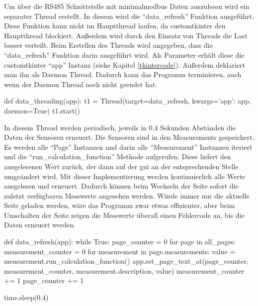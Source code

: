 \label{auslesen_rlt_parameter}

Um über die RS485 Schnittstelle mit minimalmodbus Daten auszulesen wird ein separater Thread erstellt. In diesem wird die \enquote{data\_refresh} Funktion ausgeführt. Diese Funktion kann nicht im Hauptthread laufen, da customtkinter den Hauptthread blockiert. Außerdem wird durch den Einsatz von Threads die Last besser verteilt. Beim Erstellen des Threads wird angegeben, dass die \enquote{data\_refresh} Funktion darin ausgeführt wird. Als Parameter erhält diese die customtkinter \enquote{app} Instanz (siehe Kapitel  \ref{tkintercode}). Außerdem deklariert man ihn als Daemon Thread. Dadurch kann das Programm terminieren, auch wenn der Daemon Thread noch nicht geendet hat.

\begin{pythoncode}
def data_threading(app):
	t1 = Thread(target=data_refresh, kwargs={'app': app}, daemon=True)
	t1.start()
\end{pythoncode}

In diesem Thread werden periodisch, jeweils in 0,4 Sekunden Abständen die Daten der Sensoren erneuert. Die Sensoren sind in den Measurements gespeichert. Es werden alle \enquote{Page} Instanzen und darin alle \enquote{Measurement} Instanzen iteriert und die \enquote{run\_calculation\_function} Methode aufgerufen. Diese liefert den ausgelesenen Wert zurück, der dann auf der \acs{gui} an der entsprechenden Stelle umgeändert wird. \newline Mit dieser Implementierung werden kontinuierlich alle Werte ausgelesen und erneuert. Dadurch können beim Wechseln der Seite sofort die zuletzt verfügbaren Messwerte angesehen werden. Würde immer nur die aktuelle Seite geladen werden, wäre das Programm zwar etwas effizienter, aber beim Umschalten der Seite zeigen die Messwerte überall einen Fehlercode an, bis die Daten erneuert werden. 

\begin{pythoncode}
def data_refresh(app):
	while True:
		page_counter = 0
		for page in all_pages:
			measurement_counter = 0
			for measurement in page.measurements:
				value = measurement.run_calculation_function()
				app.set_page_text_at(page_counter, measurement_counter, measurement.description, value)
				measurement_counter += 1
			page_counter += 1
		
		time.sleep(0.4)
\end{pythoncode}

